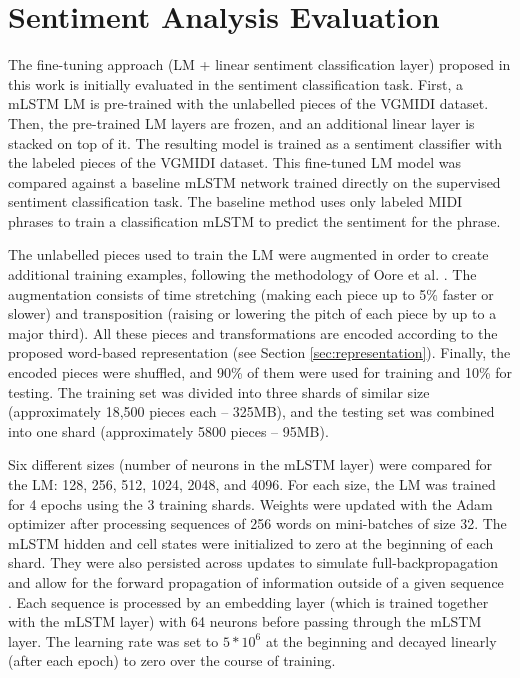 \section{Sentiment Analysis Evaluation}

The fine-tuning approach (LM + linear sentiment classification layer) proposed in this work is initially evaluated in the sentiment classification task. First, a mLSTM LM is pre-trained with the unlabelled pieces of the VGMIDI dataset. Then, the pre-trained LM layers are frozen, and an additional linear layer is stacked on top of it. The resulting model is trained as a sentiment classifier with the labeled pieces of the VGMIDI dataset. This fine-tuned LM model was compared against a baseline mLSTM network trained directly on the supervised sentiment classification task. The baseline method uses only labeled MIDI phrases to train a classification mLSTM to predict the sentiment for the phrase.

The unlabelled pieces used to train the LM were augmented in order to create additional training examples, following the methodology of Oore et al. \cite{oore2017learning}. The augmentation consists of time stretching (making each piece up to 5\% faster or slower) and transposition (raising or lowering the pitch of each piece by up to a major third). All these pieces and transformations are encoded according to the proposed word-based representation (see Section \ref{sec:representation}). Finally, the encoded pieces were shuffled, and 90\% of them were used for training and 10\% for testing. The training set was divided into three shards of similar size (approximately 18,500 pieces each -- 325MB), and the testing set was combined into one shard (approximately 5800 pieces -- 95MB).

Six different sizes (number of neurons in the mLSTM layer) were compared for the LM: 128, 256, 512, 1024, 2048, and 4096. For each size, the LM was trained for 4 epochs using the 3 training shards. Weights were updated with the Adam optimizer after processing sequences of 256 words on mini-batches of size 32. The mLSTM hidden and cell states were initialized to zero at the beginning of each shard. They were also persisted across updates to simulate full-backpropagation and allow for the forward propagation of information outside of a given sequence \cite{radford_2017}. Each sequence is processed by an embedding layer (which is trained together with the mLSTM layer) with 64 neurons before passing through the mLSTM layer. The learning rate was set to $5*10^6$ at the beginning and decayed linearly (after each epoch) to zero over the course of training.

